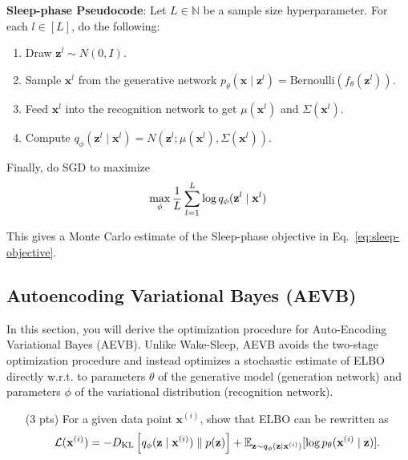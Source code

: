 \textbf{Sleep-phase Pseudocode}: Let $L \in \mathbb{N}$ be a sample size hyperparameter. For each $l \in [L]$, do the following:
\begin{enumerate}
    \item Draw $\mathbf{z}^l \sim N(0,I)$.
    \item {Sample $\mathbf{x}^l$ from the generative network $p_\theta(\mathbf{x} \mid \mathbf{z}^l) = \text{Bernoulli}(f_\theta(\mathbf{z}^l))$.}
    \item Feed $\mathbf{x}^l$ into the recognition network to get $\mu(\mathbf{x}^l)$ and $\Sigma(\mathbf{x}^l)$.
    \item Compute $q_\phi(\mathbf{z}^l \mid \mathbf{x}^l) = N(\mathbf{z}^l; \mu(\mathbf{x}^l), \Sigma(\mathbf{x}^l))$.
\end{enumerate}

Finally, do SGD to maximize
\begin{equation}
\max_\phi {1 \over L} \sum_{l=1}^L \log q_\phi( \mathbf{z}^l \mid \mathbf{x}^l )
\end{equation}

This gives a Monte Carlo estimate of the Sleep-phase objective in Eq.~\eqref{eq:sleep-objective}.

\subsection{Autoencoding Variational Bayes (AEVB)}\label{section:1-aevb}

In this section, you will derive the optimization procedure for Auto-Encoding Variational Bayes (AEVB). Unlike Wake-Sleep, AEVB avoids the two-stage optimization procedure and instead optimizes a stochastic estimate of ELBO directly w.r.t. to parameters $\theta$ of the generative model (generation network) and parameters $\phi$ of the variational distribution (recognition network).

\begin{itemize}
    \item[(3 pts)] For a given data point $\mathbf{x}^{(i)}$, show that ELBO can be rewritten as
    \begin{equation}
    \mathcal{L}(\mathbf{x}^{(i)})
    = - D_{\textrm{KL}}\left[ q_\phi(\mathbf{z} \mid \mathbf{x}^{(i)})  \;\|\; p(\mathbf{z})\right] + \mathbb{E}_{\mathbf{z} \sim q_\phi(\mathbf{z} \mid \mathbf{x}^{(i)})} [\log p_\theta(\mathbf{x}^{(i)} \mid \mathbf{z}) ].
    \label{eq:aevb-elbo}
    \end{equation}

\begin{solution}
\end{solution}

\end{itemize}

